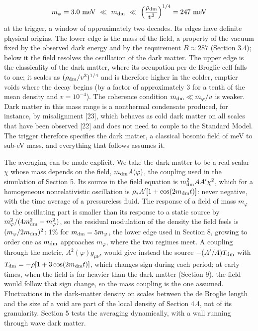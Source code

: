 \documentclass[preprint,12pt]{elsarticle}
\begin{document}
\begin{equation}
m_\varphi=3.0\ {\rm meV}\ \ll\ m_{\rm dm}\ \ll\ \left(\frac{\rho_{\rm dm}}{v^3}\right)^{1/4}=247\ {\rm meV}
\end{equation}
at the trigger, a window of approximately two decades. Its edges have definite physical origins. The lower edge is the mass of the field, a property of the vacuum fixed by the observed dark energy and by the requirement $B\approx287$ (Section 3.4); below it the field resolves the oscillation of the dark matter. The upper edge is the classicality of the dark matter, where its occupation per de Broglie cell falls to one; it scales as $(\rho_{\rm dm}/v^3)^{1/4}$ and is therefore higher in the colder, emptier voids where the decay begins (by a factor of approximately 3 for a tenth of the mean density and $v=10^{-4}$). The coherence condition $m_{\rm dm}\ll m_\varphi/v$ is weaker. Dark matter in this mass range is a nonthermal condensate produced, for instance, by misalignment [23], which behaves as cold dark matter on all scales that have been observed [22] and does not need to couple to the Standard Model. The trigger therefore specifies the dark matter, a classical bosonic field of meV to sub-eV mass, and everything that follows assumes it.

The averaging can be made explicit. We take the dark matter to be a real scalar $\chi$ whose mass depends on the field, $m_{\rm dm}A(\varphi)$, the coupling used in the simulation of Section 5. Its source in the field equation is $m_{\rm dm}^2AA'\chi^2$, which for a homogeneous nonrelativistic oscillation is $\rho_*A'[1+\cos(2m_{\rm dm}t)]$: never negative, with the time average of a pressureless fluid. The response of a field of mass $m_\varphi$ to the oscillating part is smaller than its response to a static source by $m_\varphi^2/(4m_{\rm dm}^2-m_\varphi^2)$, so the residual modulation of the density the field feels is $(m_\varphi/2m_{\rm dm})^2$: 1\% for $m_{\rm dm}=5m_\varphi$, the lower edge used in Section 8, growing to order one as $m_{\rm dm}$ approaches $m_\varphi$, where the two regimes meet. A coupling through the metric, $A^2(\varphi)g_{\mu\nu}$, would give instead the source $-(A'/A)T_{\rm dm}$ with $T_{\rm dm}=-\rho[1+3\cos(2m_{\rm dm}t)]$, which changes sign during each period; at early times, when the field is far heavier than the dark matter (Section 9), the field would follow that sign change, so the mass coupling is the one assumed. Fluctuations in the dark-matter density on scales between the de Broglie length and the size of a void are part of the local density of Section 4.4, not of its granularity. Section 5 tests the averaging dynamically, with a wall running through wave dark matter.
\end{document}
